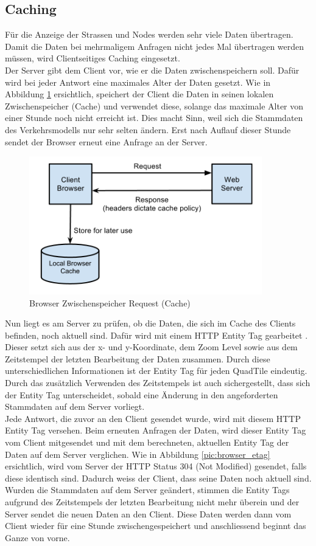 \subsection{Caching}
Für die Anzeige der Strassen und Nodes werden sehr viele Daten übertragen. Damit die Daten bei mehrmaligem Anfragen nicht jedes Mal übertragen werden müssen, wird Clientseitiges Caching eingesetzt.\\
Der Server gibt dem Client vor, wie er die Daten zwischenspeichern soll. Dafür wird bei jeder Antwort eine maximales Alter der Daten gesetzt. Wie in Abbildung \ref{pic:browser_cache} ersichtlich, speichert der Client die Daten in seinen lokalen Zwischenspeicher (Cache) und verwendet diese, solange das maximale Alter von einer Stunde noch nicht erreicht ist. Dies macht Sinn, weil sich die Stammdaten des Verkehrsmodells nur sehr selten ändern. Erst nach Auflauf dieser Stunde sendet der Browser erneut eine Anfrage an der Server.
\begin{figure}[H]
\centering
\includegraphics[height=6cm]{images/browser_cache.jpg}
\caption{Browser Zwischenspeicher Request (Cache) \cite{HTTPCacheHeaders}}
\label{pic:browser_cache}
\end{figure}
\newpage
\noindent
Nun liegt es am Server zu prüfen, ob die Daten, die sich im Cache des Clients befinden, noch aktuell sind. Dafür wird mit einem HTTP Entity Tag gearbeitet \cite{WikipediaETag}. Dieser setzt sich aus der x- und y-Koordinate, dem Zoom Level sowie aus dem Zeitstempel der letzten Bearbeitung der Daten zusammen. Durch diese unterschiedlichen Informationen ist der Entity Tag für jeden QuadTile eindeutig. Durch das zusätzlich Verwenden des Zeitstempels ist auch sichergestellt, dass sich der Entity Tag unterscheidet, sobald eine Änderung in den angeforderten Stammdaten auf dem Server vorliegt.\\
Jede Antwort, die zuvor an den Client gesendet wurde, wird mit diesem HTTP Entity Tag versehen. Beim erneuten Anfragen der Daten, wird dieser Entity Tag vom Client mitgesendet und mit dem berechneten, aktuellen Entity Tag der Daten auf dem Server verglichen. Wie in Abbildung \ref{pic:browser_etag} ersichtlich, wird vom Server der HTTP Status 304 (Not Modified) \cite{W3HttpStatus} gesendet, falls diese identisch sind. Dadurch weiss der Client, dass seine Daten noch aktuell sind. Wurden die Stammdaten auf dem Server geändert, stimmen die Entity Tags aufgrund des Zeitstempels der letzten Bearbeitung nicht mehr überein und der Server sendet die neuen Daten an den Client. Diese Daten werden dann vom Client wieder für eine Stunde zwischengespeichert und anschliessend beginnt das Ganze von vorne.
